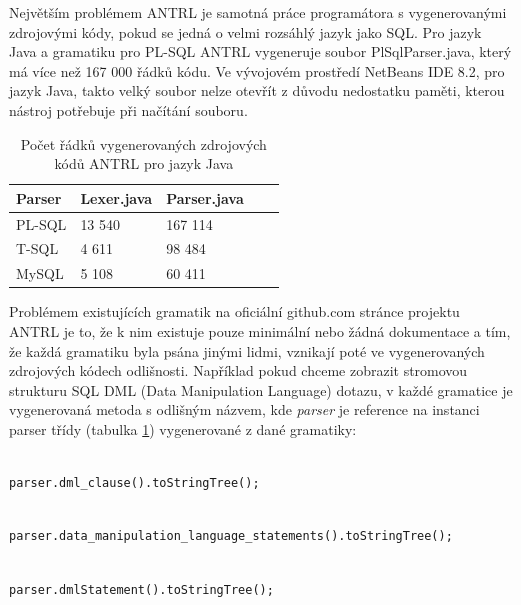 \documentclass[czech,bachelor,public,dept460,male,cpdeclaration,twoside]{diploma}
\begin{document}
Největším problémem ANTRL je samotná práce programátora s vygenerovanými zdrojovými kódy, pokud se jedná o velmi rozsáhlý jazyk jako SQL. Pro jazyk Java a gramatiku pro PL-SQL ANTRL vygeneruje soubor PlSqlParser.java, který má více než 167 000 řádků kódu. Ve vývojovém prostředí NetBeans IDE 8.2, pro jazyk Java, takto velký soubor nelze otevřít z důvodu nedostatku paměti, kterou nástroj potřebuje při načítání souboru.

\begin{table}[!htbp]
	\centering
	\caption{Počet řádků vygenerovaných zdrojových kódů ANTRL pro jazyk Java}
	\label{tab:parsers}
	\begin{tabular}{lllll}
		\toprule
		Parser & Lexer.java & Parser.java\\
		\midrule
		PL-SQL & 13 540 & 167 114 \\
        T-SQL & 4 611 & 98 484 \\
        MySQL & 5 108 & 60 411 \\
		\midrule
	\end{tabular}
\end{table}


Problémem existujících gramatik na oficiální github.com stránce projektu ANTRL je to, že k nim existuje pouze minimální nebo žádná dokumentace a tím, že každá gramatiku byla psána jinými lidmi, vznikají poté ve vygenerovaných zdrojových kódech odlišnosti. Například pokud chceme zobrazit stromovou strukturu SQL DML (Data Manipulation Language) dotazu, v každé gramatice je vygenerovaná metoda s odlišným názvem, kde \textit{parser} je reference na instanci parser třídy (tabulka \ref{tab:parsers}) vygenerované z dané gramatiky:\newline

\begin{lstlisting}[caption=T-SQL Parser]

parser.dml_clause().toStringTree();
\end{lstlisting}

\begin{lstlisting}[caption=PL-SQL Parser]

parser.data_manipulation_language_statements().toStringTree();
\end{lstlisting}

\begin{lstlisting}[caption=MySQL Parser]

parser.dmlStatement().toStringTree();
\end{lstlisting}

\newpage
\end{document}
